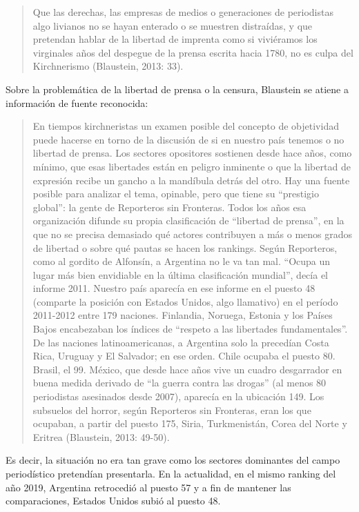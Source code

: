 {\begin{quote}
Que las derechas, las empresas de medios o generaciones de periodistas algo livianos no se hayan enterado o se muestren distraídas, y que pretendan hablar de la libertad de imprenta como si viviéramos los virginales años del despegue de la prensa escrita hacia 1780, no es culpa del Kirchnerismo (Blaustein, 2013: 33).
\end{quote}

Sobre la problemática de la libertad de prensa o la censura, Blaustein se atiene a información de fuente reconocida:

\begin{quote}
En tiempos kirchneristas un examen posible del concepto de objetividad puede hacerse en torno de la discusión de si en nuestro país tenemos o no libertad de prensa. Los sectores opositores sostienen desde hace años, como mínimo, que esas libertades están en peligro inminente o que la libertad de expresión recibe un gancho a la mandíbula detrás del otro. Hay una fuente posible para analizar el tema, opinable, pero que tiene su ``prestigio global'': la gente de Reporteros sin Fronteras. Todos los años esa organización difunde su propia clasificación de ``libertad de prensa'', en la que no se precisa demasiado qué actores contribuyen a más o menos grados de libertad o sobre qué pautas se hacen los rankings. Según Reporteros, como al gordito de Alfonsín, a Argentina no le va tan mal. ``Ocupa un lugar más bien envidiable en la última clasificación mundial'', decía el informe 2011. Nuestro país aparecía en ese informe en el puesto 48 (comparte la posición con Estados Unidos, algo llamativo) en el período 2011-2012 entre 179 naciones. Finlandia, Noruega, Estonia y los Países Bajos encabezaban los índices de ``respeto a las libertades fundamentales''. De las naciones latinoamericanas, a Argentina solo la precedían Costa Rica, Uruguay y El Salvador; en ese orden. Chile ocupaba el puesto 80. Brasil, el 99. México, que desde hace años vive un cuadro desgarrador en buena medida derivado de ``la guerra contra las drogas'' (al menos 80 periodistas asesinados desde 2007), aparecía en la ubicación 149. Los subsuelos del horror\textquotesingle, según Reporteros sin Fronteras, eran los que ocupaban, a partir del puesto 175, Siria, Turkmenistán, Corea del Norte y Eritrea (Blaustein, 2013: 49-50).
\end{quote}

Es decir, la situación no era tan grave como los sectores dominantes del campo periodístico pretendían presentarla. En la actualidad, en el mismo ranking del año 2019, Argentina retrocedió al puesto 57 y a fin de mantener las comparaciones, Estados Unidos subió al puesto 48.

}

